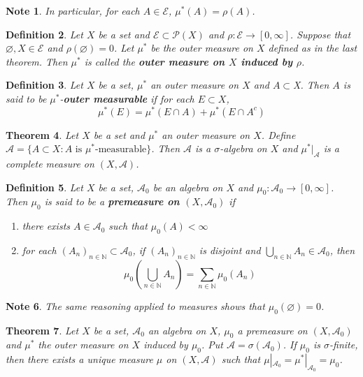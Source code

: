 \documentclass[12pt]{amsart}
\newtheorem{thm}{Theorem}[section]
\newtheorem{defn}[thm]{Definition}
\newtheorem{note}[thm]{Note}
\newcommand{\sig}{\sigma}
\newcommand{\N}{\mathbb{N}}
\newcommand{\MA}{\mathcal{A}}
\newcommand{\MP}{\mathcal{P}}
\newcommand{\ME}{\mathcal{E}}
\begin{document}
\begin{note}
In particular, for each $A \in \ME$, $\mu^*(A) = \rho(A)$.
\end{note}

\begin{defn}
Let $X$ be a set and $\ME \subset \MP(X)$ and $\rho: \ME \rightarrow [0, \infty]$. Suppose that $\varnothing, X \in \ME$ and $\rho(\varnothing) = 0$. Let $\mu^*$ be the outer measure on $X$ defined as in the last theorem. Then $\mu^*$ is called the \textbf{outer measure on $X$ induced by $\rho$}.
\end{defn}

\begin{defn}
Let $X$ be a set, $\mu^*$ an outer measure on $X$ and $A \subset $X. Then $A$ is said to be $\mu^*$-\textbf{outer measurable} if for each $E \subset X$, $$\mu^*(E) = \mu^*(E \cap A) + \mu^*(E \cap A^c)$$ 
\end{defn}

\begin{thm}
Let $X$ be a set and $\mu^*$ an outer measure on $X$. Define $\MA = \{A \subset X: A \text{ is }\mu^*\text{-measurable}\}$. Then $\MA$ is a $\sig$-algebra on $X$ and $\mu^*|_{\MA}$ is a complete measure on $(X, \MA)$.
\end{thm}

\begin{defn}
Let $X$ be a set, $\MA_0$ be an algebra on $X$ and $\mu_0:\MA_0 \rightarrow [0, \infty]$. Then $\mu_0$ is said to be a \textbf{premeasure on $(X,\MA_0)$} if 
\begin{enumerate}
\item there exists $A \in \MA_0$ such that $\mu_0(A)< \infty$
\item for each $(A_n)_{n \in \N} \subset \MA_0$, if $(A_n)_{n \in \N}$ is disjoint and $\bigcup\limits_{n \in \N}A_n \in \MA_0$, then $$\mu_0(\bigcup_{n\in \N}A_n) = \sum_{n \in \N}\mu_0(A_n)$$
\end{enumerate}
\end{defn}

\begin{note}
The same reasoning applied to measures shows that $\mu_0(\varnothing) = 0$.
\end{note}

\begin{thm}
Let $X$ be a set, $\MA_0$ an algebra on $X$, $\mu_0$ a premeasure on $(X,\MA_0)$ and $\mu^*$ the outer measure on $X$ induced by $\mu_0$. Put $\MA = \sig(\MA_0)$. If $\mu_0$ is $\sig$-finite, then there exists a unique measure $\mu$ on $(X, \MA)$ such that $\mu|_{\MA_0} = \mu^*|_{\MA_0} = \mu_0$. 
\end{thm}
\end{document}
